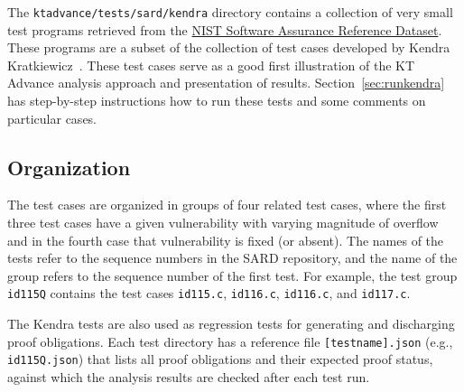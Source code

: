 \documentclass[11pt]{article}
\begin{document}
The {\tt ktadvance/tests/sard/kendra} directory contains a collection of very small test
programs retrieved from the \href{http://samate.nist.gov/SRD}{NIST Software Assurance Reference Dataset}.
These programs are a subset of the collection of test cases developed by 
Kendra Kratkiewicz~\cite{Kratkiewicz/05/Using}. These test cases serve as a good first 
illustration of
the KT Advance analysis approach and presentation of results. 
Section~\ref{sec:runkendra} has step-by-step instructions how to run these tests
and some comments on particular cases.

\subsection{Organization}

The test cases are organized in groups of four related test cases, where the first 
three test cases have a given vulnerability with varying magnitude of overflow and 
in the fourth case that vulnerability is fixed (or absent). The names of the tests 
refer to the sequence numbers in the SARD repository, and the name of the group 
refers to the sequence number of the first test. For example, the test group {\tt id115Q}
contains the test cases {\tt id115.c}, {\tt id116.c}, {\tt id116.c}, and {\tt id117.c}. 

The Kendra tests are also used as regression tests for generating and discharging proof 
obligations.
Each test directory has a reference file {\tt [testname].json} (e.g., {\tt id115Q.json}) that lists 
all proof obligations and their expected proof status, against which the analysis results are checked after
each test run.
\end{document}
